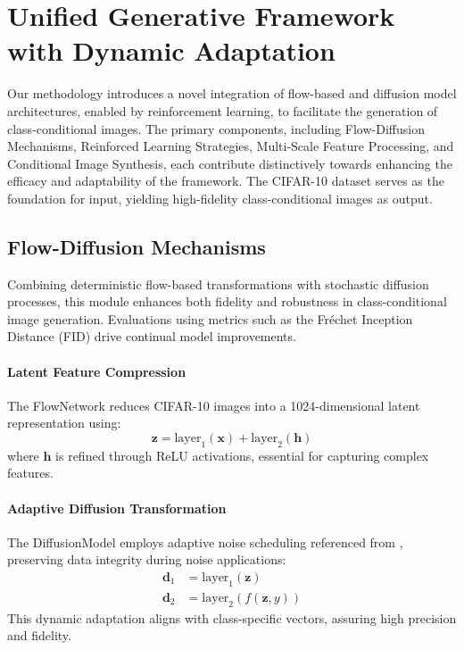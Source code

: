 \section{Unified Generative Framework with Dynamic Adaptation}

Our methodology introduces a novel integration of flow-based and diffusion model architectures, enabled by reinforcement learning, to facilitate the generation of class-conditional images. The primary components, including Flow-Diffusion Mechanisms, Reinforced Learning Strategies, Multi-Scale Feature Processing, and Conditional Image Synthesis, each contribute distinctively towards enhancing the efficacy and adaptability of the framework. The CIFAR-10 dataset serves as the foundation for input, yielding high-fidelity class-conditional images as output.

\subsection{Flow-Diffusion Mechanisms}
Combining deterministic flow-based transformations with stochastic diffusion processes, this module enhances both fidelity and robustness in class-conditional image generation. Evaluations using metrics such as the Fréchet Inception Distance (FID) drive continual model improvements.

\paragraph{Latent Feature Compression}
The FlowNetwork reduces CIFAR-10 images into a 1024-dimensional latent representation using:
\begin{equation}
\mathbf{z} = \text{layer}_1(\mathbf{x}) + \text{layer}_2(\mathbf{h})
\end{equation}
where $\mathbf{h}$ is refined through ReLU activations, essential for capturing complex features.

\paragraph{Adaptive Diffusion Transformation}
The DiffusionModel employs adaptive noise scheduling referenced from \cite{Song2021}, preserving data integrity during noise applications:
\begin{align}
\mathbf{d}_1 &= \text{layer}_1(\mathbf{z})\\
\mathbf{d}_2 &= \text{layer}_2(f(\mathbf{z}, y))
\end{align}
This dynamic adaptation aligns with class-specific vectors, assuring high precision and fidelity.

